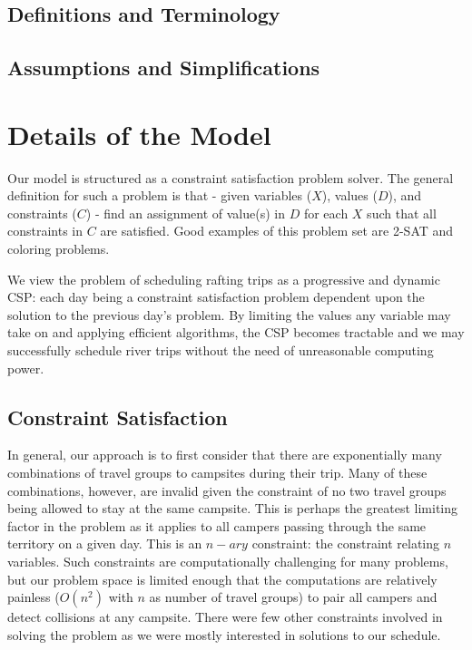 \documentclass[11pt]{article} %
\begin{document}
\subsection{Definitions and Terminology}
\label{sec:defs}


\subsection{Assumptions and Simplifications}
\label{sec:assumptions}


\section{Details of the Model}
\label{sec:model-details}
Our model is structured as a constraint satisfaction problem solver.
The general definition
for such a problem is that - given variables ($X$), values ($D$),
and constraints ($C$) - find an assignment of value(s) in $D$
for each $X$ such that all constraints in $C$ are satisfied.
Good examples of this problem set are 2-SAT and coloring problems.

We view the problem of scheduling rafting trips as a progressive and dynamic
CSP: each day being a constraint satisfaction problem dependent upon the
solution to the previous day's problem.  By limiting the values any variable
may take on and applying efficient algorithms, the CSP becomes tractable and
we may successfully schedule river trips without the need of unreasonable
computing power.

\subsection{Constraint Satisfaction}
\label{sec:csp}

In general, our approach is to first consider that there are exponentially
many combinations of travel groups to campsites during their trip.  Many of
these combinations, however, are invalid given the constraint of no two
travel groups being allowed to stay at the same campsite.  This is perhaps
the greatest limiting factor in the problem as it applies to all campers
passing through the same territory on a given day.  This is an $n-ary$
constraint: the constraint relating $n$ variables.  Such constraints are
computationally challenging for many problems, but our problem space is limited
enough that the computations are relatively painless ($O(n^2)$ with $n$ as
number of travel groups) to pair all campers and detect collisions at any
campsite.  There were few other constraints involved in solving the problem
as we were mostly interested in solutions to our schedule.
\end{document}
